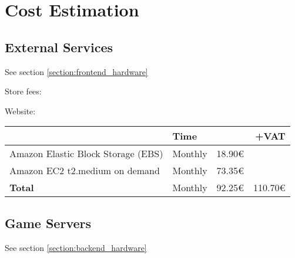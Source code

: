 \section{Cost Estimation}
\label{section:Development_software}

\subsection{External Services}

See section \ref{section:frontend_hardware}

Store fees:


Website:

\begin{tabular}{ | l l | r | r | }
	\hline
	                                   & Time    &        & +VAT \\
	\hline
	Amazon Elastic Block Storage (EBS) & Monthly & 18.90€ & \\
	Amazon EC2 t2.medium on demand     & Monthly & 73.35€ & \\
	\hline
	\textbf{Total}                     & Monthly & 92.25€ & 110.70€\\
	\hline
\end{tabular}

\subsection{Game Servers}

See section \ref{section:backend_hardware}

